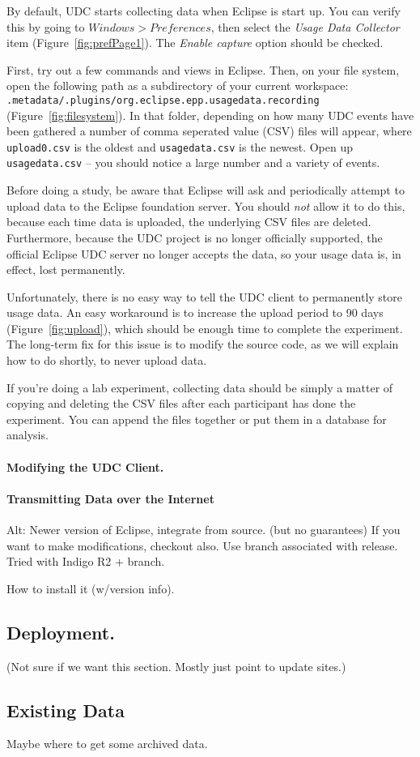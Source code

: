 By default, UDC starts collecting data when Eclipse is start up. 
You can verify this by going to $Windows > Preferences$, then 
select the \textit{Usage Data Collector} item (Figure~\ref{fig:prefPage1}).
The \textit{Enable capture} option should be checked.

First, try out a few commands and views in Eclipse.
Then, on your file system, open the following path as a subdirectory
of your current workspace: \texttt{.metadata/.plugins/org.eclipse.epp.usagedata.recording}
(Figure~\ref{fig:filesystem}).
In that folder, depending on how many UDC events have been gathered 
a number of comma seperated value (CSV) files will appear, where \texttt{upload0.csv} is the oldest
and \texttt{usagedata.csv} is the newest.
Open up \texttt{usagedata.csv} -- you should notice a large number and a variety of events.

Before doing a study, be aware that Eclipse will ask and periodically attempt to upload
data to the Eclipse foundation server.
You should \emph{not} allow it to do this, because each time data is uploaded, the underlying
CSV files are deleted.
Furthermore, because the UDC project is no longer officially supported, the official Eclipse
UDC server no longer accepts the data, so your usage data is, in effect, lost permanently.

Unfortunately, there is no easy way to tell the UDC client to permanently store
usage data.
An easy workaround is to increase the upload period to 90 days (Figure~\ref{fig:upload}),
which should be enough time to complete the experiment.
The long-term fix for this issue is to modify the source code, as we will explain
how to do shortly, to never upload data.

If you're doing a lab experiment, collecting data should be simply a matter of 
copying and deleting the CSV files after each participant has done the experiment.
You can append the files together or put them in a database for analysis.

\paragraph{Modifying the UDC Client.}

\paragraph{Transmitting Data over the Internet}


Alt:
Newer version of Eclipse, integrate from source. (but no guarantees)
If you want to make modifications, checkout also. Use branch associated with release. 
Tried with Indigo R2 + branch.

How to install it (w/version info). 

\subsection{Deployment.}

(Not sure if we want this section. Mostly just point to update sites.)

\subsection{Existing Data}

Maybe where to get some archived data. 